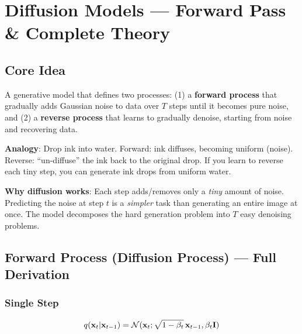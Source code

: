 \section{Diffusion Models — Forward Pass \& Complete Theory}

\subsection{Core Idea}
\begin{definition}
A generative model that defines two processes: (1) a \textbf{forward process} that gradually adds Gaussian noise to data over $T$ steps until it becomes pure noise, and (2) a \textbf{reverse process} that learns to gradually denoise, starting from noise and recovering data.
\end{definition}

\textbf{Analogy}: Drop ink into water. Forward: ink diffuses, becoming uniform (noise). Reverse: ``un-diffuse'' the ink back to the original drop. If you learn to reverse each tiny step, you can generate ink drops from uniform water.

\textbf{Why diffusion works}: Each step adds/removes only a \textit{tiny} amount of noise. Predicting the noise at step $t$ is a \emph{simpler} task than generating an entire image at once. The model decomposes the hard generation problem into $T$ easy denoising problems.

\subsection{Forward Process (Diffusion Process) — Full Derivation}

\subsubsection{Single Step}
$$q(\mathbf{x}_t|\mathbf{x}_{t-1}) = \mathcal{N}(\mathbf{x}_t; \sqrt{1-\beta_t}\,\mathbf{x}_{t-1}, \beta_t\mathbf{I})$$


